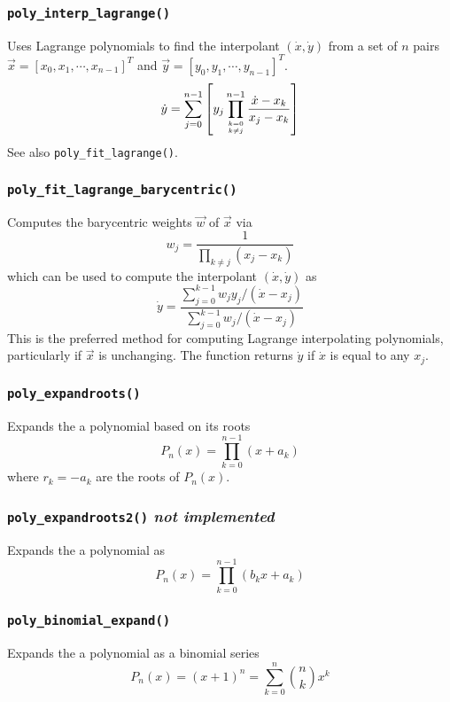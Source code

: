 \subsubsection{{\tt poly\_interp\_lagrange()}}
Uses Lagrange polynomials to find the interpolant
$(\dot{x},\dot{y})$ from a set of $n$ pairs
$\vec{x}=[x_0,x_1,\cdots,x_{n-1}]^T$ and 
$\vec{y}=[y_0,y_1,\cdots,y_{n-1}]^T$.
\[
    \dot{y} =
        \sum_{j=0}^{n-1} {
            \left[
            y_j
            \prod_{{k=0}\atop{k \ne j}}^{n-1} {
                \frac{\dot{x}-x_k}{x_j-x_k}
            }
            \right]
        }
\]
See also {\tt poly\_fit\_lagrange()}.

\subsubsection{{\tt poly\_fit\_lagrange\_barycentric()}}
Computes the barycentric weights $\vec{w}$ of $\vec{x}$ via
\[
    w_j =   \frac{1}{
                \prod_{k \ne j}{\left(x_j - x_k\right)}
            }
\]
which can be used to compute the interpolant $(\dot{x},\dot{y})$ as
\[
    \dot{y} =   \frac{
                    \sum\limits_{j=0}^{k-1}{ w_j y_j /(\dot{x}-x_j) }
                } {
                    \sum\limits_{j=0}^{k-1}{     w_j /(\dot{x}-x_j) }
                }
\]
This is the preferred method for computing Lagrange interpolating polynomials,
particularly if $\vec{x}$ is unchanging.
The function returns $\dot{y}$ if $\dot{x}$ is equal to any $x_j$.

\subsubsection{{\tt poly\_expandroots()}}
Expands the a polynomial based on its roots
\[
    P_n(x) = \prod_{k=0}^{n-1}{(x+a_k)}
\]
where $r_k=-a_k$ are the roots of $P_n(x)$.

\subsubsection{{\tt poly\_expandroots2()} {\it not implemented}}
Expands the a polynomial as
\[
    P_n(x) = \prod_{k=0}^{n-1}{(b_kx+a_k)}
\]

\subsubsection{{\tt poly\_binomial\_expand()}}
Expands the a polynomial as a binomial series
\[
    P_n(x) = (x+1)^n = \sum_{k=0}^{n}{ {n \choose k} x^k}
\]

